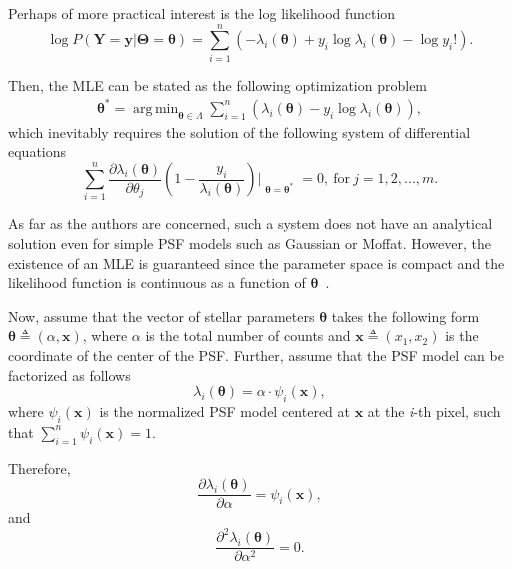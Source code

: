 \documentclass{rnaastex}
\DeclareMathOperator*{\argmin}{arg\,min}
\begin{document}
Perhaps of more practical interest is the log likelihood function
\begin{equation}
    \log P(\bm{Y} = \bm{y} | \bm{\Theta} = \bm{\theta}) = \sum_{i=1}^{n}\left(- \lambda_i(\bm{\theta}) + y_i\log\lambda_i(\bm{\theta}) - \log y_i !\right).
\end{equation}

Then, the MLE can be stated as the following optimization problem
\begin{align}
    \bm{\theta}^{*} = \argmin_{\bm{\theta} \in \Lambda} \sum_{i=1}^{n}\left(\lambda_i(\bm{\theta}) - y_i\log\lambda_i(\bm{\theta})\right),
\end{align}
which inevitably requires the solution of the following system of differential equations
\begin{equation}
    \sum_{i=1}^{n}\dfrac{\partial \lambda_i(\bm{\theta})}{\partial \theta_j}\left(1 - \dfrac{y_i}{\lambda_i(\bm{\theta})} \right)\Bigr|_{\substack{\bm{\theta}=\bm{\theta}^{*}}} = 0,~\mathrm{for}~j=1, 2, ..., m.
    \label{eq:partial_eqs}
\end{equation}

As far as the authors are concerned, such a system does not have an analytical solution even for simple PSF models such as Gaussian or Moffat. However, the existence of an MLE is guaranteed since the parameter space is compact and the likelihood function is continuous as a function of $\bm{\theta}$~\citep{poor:1998}.

Now, assume that the vector of stellar parameters $\bm{\theta}$ takes the following form $\bm{\theta} \triangleq (\alpha, \bm{x})$, where $\alpha$ is the total number of counts and $\bm{x} \triangleq (x_1, x_2)$ is the coordinate of the center of the PSF. Further, assume that the PSF model can be factorized as follows
\begin{equation}
    \lambda_i(\bm{\theta}) = \alpha\cdot\psi_i(\bm{x}),
    \label{eq:psf_model}
\end{equation}
where $\psi_i(\bm{x})$ is the normalized PSF model centered at $\bm{x}$ at the \textit{i}-th pixel, such
that $\sum_{i=1}^{n}\psi_i(\bm{x})=1$.

Therefore,
\begin{equation}
    \dfrac{\partial{\lambda_i(\bm{\theta})}}{\partial \alpha} = \psi_i(\bm{x}),
    \label{eq:partial_flux}
\end{equation}
and
\begin{equation}
    \dfrac{\partial^2{\lambda_i(\bm{\theta})}}{\partial \alpha^2} = 0.
    \label{eq:partial2_flux}
\end{equation}
\end{document}
